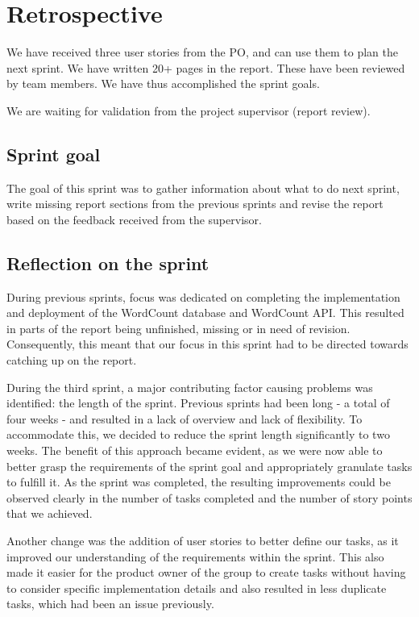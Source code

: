 \section{Retrospective}
We have received three user stories from the PO, and can use them to plan the next sprint.  We have written 20+ pages in the report. These have been reviewed by team members.  We have thus accomplished the sprint goals. 

We are waiting for validation from the project supervisor (report review).

\subsection{Sprint goal}
The goal of this sprint was to gather information about what to do next sprint, write missing report sections from the previous sprints and revise the report based on the feedback received from the supervisor. 

\subsection{Reflection on the sprint}
During previous sprints, focus was dedicated on completing the implementation and deployment of the WordCount database and WordCount API. This resulted in parts of the report being unfinished, missing or in need of revision. Consequently, this meant that our focus in this sprint had to be directed towards catching up on the report.


During the third sprint, a major contributing factor causing problems was identified: the length of the sprint. Previous sprints had been long - a total of four weeks - and resulted in a lack of overview and lack of flexibility. To accommodate this, we decided to reduce the sprint length significantly to two weeks. The benefit of this approach became evident, as we were now able to better grasp the requirements of the sprint goal and appropriately granulate tasks to fulfill it. As the sprint was completed, the resulting improvements could be observed clearly in the number of tasks completed and the number of story points that we achieved. 


Another change was the addition of user stories to better define our tasks, as it improved our understanding of the requirements within the sprint. This also made it easier for the product owner of the group to create tasks without having to consider specific implementation details and also resulted in less duplicate tasks, which had been an issue previously.



